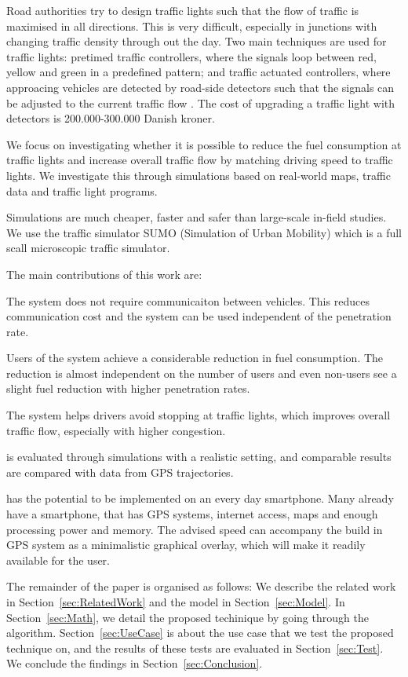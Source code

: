 Road authorities try to design traffic lights such that the flow of traffic is maximised in all directions.
This is very difficult, especially in junctions with changing traffic density through out the day.
Two main techniques are used for traffic lights: pretimed traffic controllers, where the signals loop between red, yellow and green in a predefined pattern; and traffic actuated controllers, where approacing vehicles are detected by road-side detectors such that the signals can be adjusted to the current traffic flow \cite{Vejdir}.
The cost of upgrading a traffic light with detectors is 200.000-300.000 Danish kroner\cite{Vejdir}.

We focus on investigating whether it is possible to reduce the fuel consumption at traffic lights and increase overall traffic flow by matching driving speed to traffic lights. 
We investigate this through simulations based on real-world maps, traffic data and traffic light programs.

Simulations are much cheaper, faster and safer than large-scale in-field studies. 
We use the traffic simulator SUMO (Simulation of Urban Mobility)\cite{sumo} which is a full scall microscopic traffic simulator.

The main contributions of this work are:
\begin{enumerate*}
\item The system does not require communicaiton between vehicles. This reduces communication cost and the system can be used independent of the penetration rate.
\item Users of the system achieve a considerable reduction in fuel consumption. The reduction is almost independent on the number of users and even non-users see a slight fuel reduction with higher penetration rates.
\item The system helps drivers avoid stopping at traffic lights, which improves overall traffic flow, especially with higher congestion.
\item \tech is evaluated through simulations with a realistic setting, and comparable results are compared with data from GPS trajectories.
\end{enumerate*}

\tech has the potential to be implemented on an every day smartphone. 
Many already have a smartphone, that has GPS systems, internet access, maps and enough processing power and memory.
The advised speed can accompany the build in GPS system as a minimalistic graphical overlay, which will make it readily available for the user.

The remainder of the paper is organised as follows: 
We describe the related work in Section~\ref{sec:RelatedWork} and the model in Section~\ref{sec:Model}. 
In Section~\ref{sec:Math}, we detail the proposed techinique by going through the algorithm.
Section~\ref{sec:UseCase} is about the use case that we test the proposed technique on, and the results of these tests are evaluated in Section~\ref{sec:Test}. 
We conclude the findings in Section~\ref{sec:Conclusion}.





